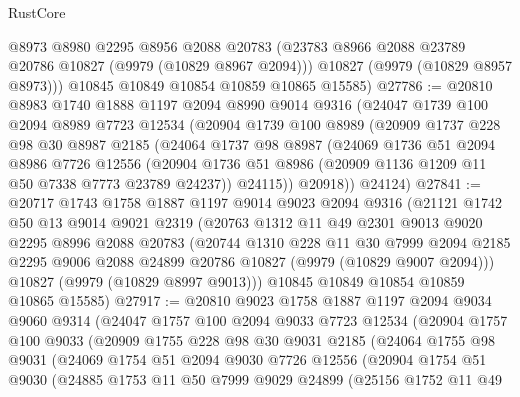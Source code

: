 \begin{lexlean}{RustCore}
\begin{coremodule}
        @8973
        @8980
        @2295
        @8956
        @2088
        @20783
        (@23783 @8966 @2088 @23789 @20786 @10827 (@9979 (@10829 @8967 @2094)))
        @10827
        (@9979 (@10829 @8957 @8973)))
      @10845
      @10849
      @10854
      @10859
      @10865
      @15585)
@27786 := @20810
    @8983
    @1740
    @1888
    @1197
    @2094
    @8990
    @9014
    @9316
    (@24047
      @1739
      @100
      @2094
      @8989
      @7723
      @12534
      (@20904
        @1739
        @100
        @8989
        (@20909
          @1737
          @228
          @98
          @30
          @8987
          @2185
          (@24064
            @1737
            @98
            @8987
            (@24069
              @1736
              @51
              @2094
              @8986
              @7726
              @12556
              (@20904 @1736 @51 @8986 (@20909 @1136 @1209 @11 @50 @7338 @7773 @23789 @24237))
              @24115))
          @20918))
      @24124)
@27841 := @20717
    @1743
    @1758
    @1887
    @1197
    @9014
    @9023
    @2094
    @9316
    (@21121
      @1742
      @50
      @13
      @9014
      @9021
      @2319
      (@20763
        @1312
        @11
        @49
        @2301
        @9013
        @9020
        @2295
        @8996
        @2088
        @20783
        (@20744
          @1310
          @228
          @11
          @30
          @7999
          @2094
          @2185
          @2295
          @9006
          @2088
          @24899
          @20786
          @10827
          (@9979 (@10829 @9007 @2094)))
        @10827
        (@9979 (@10829 @8997 @9013)))
      @10845
      @10849
      @10854
      @10859
      @10865
      @15585)
@27917 := @20810
    @9023
    @1758
    @1887
    @1197
    @2094
    @9034
    @9060
    @9314
    (@24047
      @1757
      @100
      @2094
      @9033
      @7723
      @12534
      (@20904
        @1757
        @100
        @9033
        (@20909
          @1755
          @228
          @98
          @30
          @9031
          @2185
          (@24064
            @1755
            @98
            @9031
            (@24069
              @1754
              @51
              @2094
              @9030
              @7726
              @12556
              (@20904
                @1754
                @51
                @9030
                (@24885
                  @1753
                  @11
                  @50
                  @7999
                  @9029
                  @24899
                  (@25156
                    @1752
                    @11
                    @49

\end{coremodule}
\end{lexlean}
